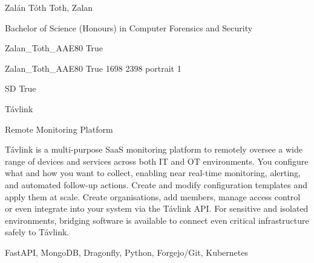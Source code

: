 
\begingroup{}\relax



\def\Key{Zalan_Toth_AAE80}

{Zalán Tóth}
{Toth, Zalan}

{Bachelor of Science (Honours) in Computer Forensics and Security}

{Zalan_Toth_AAE80}
{True}

{Zalan_Toth_AAE80}
{True}
{1698}
{2398}
{portrait}
{1}

{SD}
{True}

{Távlink}

{Remote Monitoring Platform}

{Távlink is a multi-purpose SaaS monitoring platform to remotely oversee a wide range of devices and services across both IT and OT environments. You configure what and how you want to collect, enabling near real-time monitoring, alerting, and automated follow-up actions. Create and modify configuration templates and apply them at scale. Create organisations, add members, manage access control or even integrate into your system via the Távlink API. For sensitive and isolated environments, bridging software is available to connect even critical infrastructure safely to Távlink.}

{FastAPI, MongoDB, Dragonfly, Python, Forgejo/Git, Kubernetes}

